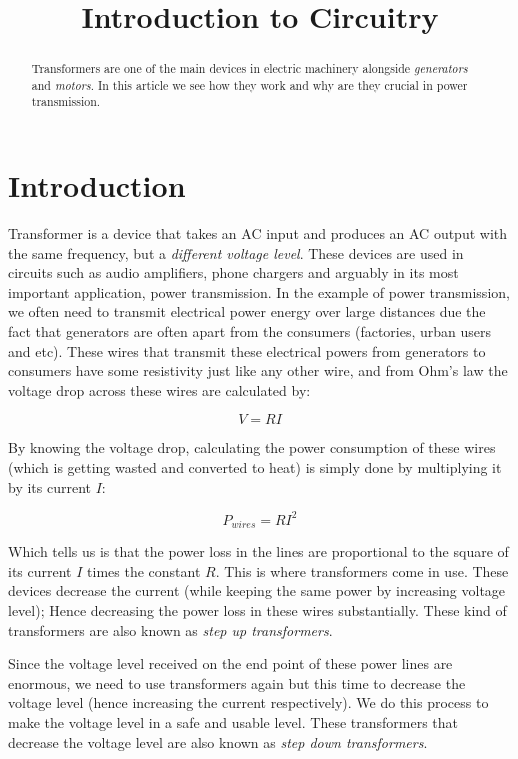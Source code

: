 \documentclass{article}
\begin{document}
	
	\title{Introduction to Circuitry}
	\author{}
	
	\maketitle
	
	\begin{abstract}
	Transformers are one of the main devices in electric machinery alongside \textit{generators} and \textit{motors}.
	In this article we see how they work and why are they crucial in power transmission.
	\end{abstract}
	
	\section{Introduction}
	Transformer is a device that takes an AC input and produces an AC output with the same frequency, but a \textit{different voltage level}.
	These devices are used in circuits such as audio amplifiers, phone chargers and arguably in its most important application, power transmission.
	In the example of power transmission, we often need to transmit electrical power energy over large distances due the fact that generators are often apart from the consumers (factories, urban users and etc). These wires that transmit these electrical powers from generators to consumers have some resistivity just like any other wire, and from Ohm's law the voltage drop across these wires are calculated by:
	
	$$V = RI$$
	
	By knowing the voltage drop, calculating the power consumption of these wires (which is getting wasted and converted to heat) is simply done by multiplying it by its current $I$:
	
	$$P_{wires} = RI^2 $$
	
	Which tells us is that the power loss in the lines are proportional to the square of its current $I$ times the constant $R$.
	This is where transformers come in use.
	These devices decrease the current (while keeping the same power by increasing voltage level); Hence decreasing the power loss in these wires substantially.
	These kind of transformers are also known as \textit{step up transformers}.
	
	Since the voltage level received on the end point of these power lines are enormous, we need to use transformers again but this time to decrease the voltage level (hence increasing the current respectively).
	We do this process to make the voltage level in a safe and usable level. These transformers that decrease the voltage level are also known as \textit{step down transformers}.
	
\end{document}
